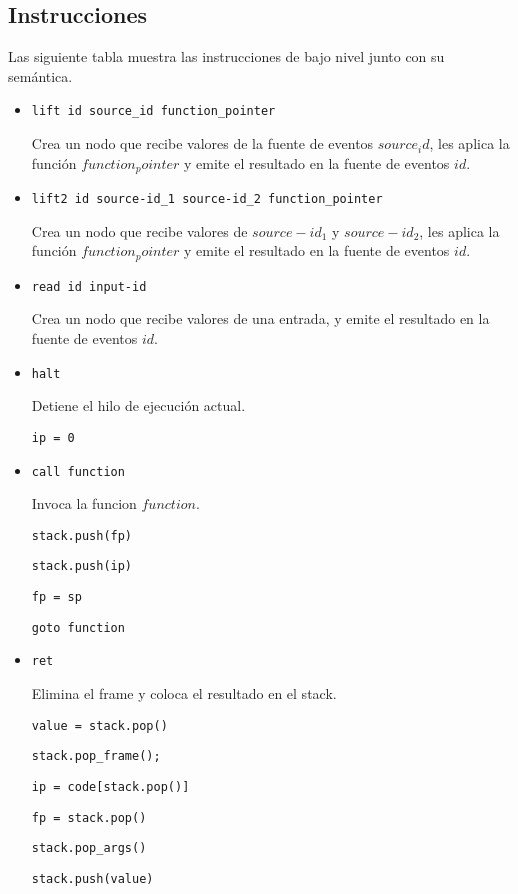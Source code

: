 \subsection{Instrucciones}

Las siguiente tabla muestra las instrucciones de bajo nivel junto con su semántica.

\begin{itemize}
\item \texttt{lift id source\_id function\_pointer}

 Crea un nodo que recibe valores de la fuente de
 eventos $source_id$,
 les aplica la función $function_pointer$ y emite el resultado
 en la fuente de eventos $id$.

\item \texttt{lift2 id source-id\_1 source-id\_2 function\_pointer}

 Crea un nodo que recibe valores de $source-id_1$ y
 $source-id_2$,
 les aplica la función $function_pointer$ y emite el resultado
 en la fuente de eventos $id$.

\item \texttt{read id input-id}

 Crea un nodo que recibe valores de una entrada,
 y emite el resultado en la fuente de eventos $id$.

\item \texttt{halt}

  Detiene el hilo de ejecución actual.

  \texttt{ip = 0} 

\item \texttt{call function}

  Invoca la funcion $function$.

  \texttt{stack.push(fp)}

  \texttt{stack.push(ip)}

  \texttt{fp = sp}

  \texttt{goto function}

\item \texttt{ret}

  Elimina el frame y coloca el resultado en el stack.

  \texttt{value = stack.pop()}

  \texttt{stack.pop\_frame();}

  \texttt{ip = code[stack.pop()]}

  \texttt{fp = stack.pop()}

  \texttt{stack.pop\_args()}

  \texttt{stack.push(value)}


\end{itemize}

